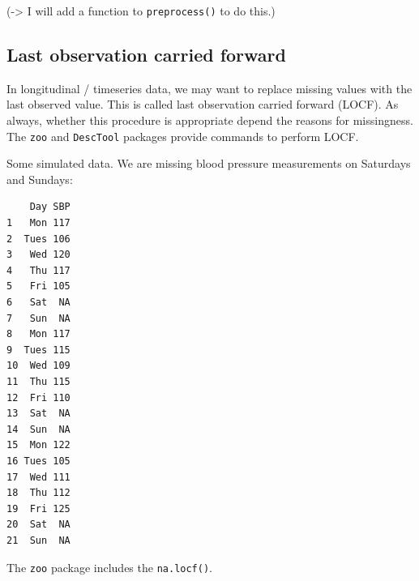 \documentclass[
]{book}
\newenvironment{Shaded}{\begin{snugshade}}{\end{snugshade}}
\newcommand{\AttributeTok}[1]{\textcolor[rgb]{0.77,0.63,0.00}{#1}}
\newcommand{\ConstantTok}[1]{\textcolor[rgb]{0.00,0.00,0.00}{#1}}
\newcommand{\DecValTok}[1]{\textcolor[rgb]{0.00,0.00,0.81}{#1}}
\newcommand{\FunctionTok}[1]{\textcolor[rgb]{0.00,0.00,0.00}{#1}}
\newcommand{\NormalTok}[1]{#1}
\newcommand{\OtherTok}[1]{\textcolor[rgb]{0.56,0.35,0.01}{#1}}
\newcommand{\SpecialCharTok}[1]{\textcolor[rgb]{0.00,0.00,0.00}{#1}}
\newcommand{\StringTok}[1]{\textcolor[rgb]{0.31,0.60,0.02}{#1}}
\begin{document}
(-\textgreater{} I will add a function to \texttt{preprocess()} to do this.)

\hypertarget{last-observation-carried-forward}{%
\subsection{Last observation carried forward}\label{last-observation-carried-forward}}

In longitudinal / timeseries data, we may want to replace missing values with the last observed value. This is called last observation carried forward (LOCF). As always, whether this procedure is appropriate depend the reasons for missingness. The \texttt{zoo} and \texttt{DescTool} packages provide commands to perform LOCF.

Some simulated data. We are missing blood pressure measurements on Saturdays and Sundays:

\begin{Shaded}
\end{Shaded}

\begin{verbatim}
    Day SBP
1   Mon 117
2  Tues 106
3   Wed 120
4   Thu 117
5   Fri 105
6   Sat  NA
7   Sun  NA
8   Mon 117
9  Tues 115
10  Wed 109
11  Thu 115
12  Fri 110
13  Sat  NA
14  Sun  NA
15  Mon 122
16 Tues 105
17  Wed 111
18  Thu 112
19  Fri 125
20  Sat  NA
21  Sun  NA
\end{verbatim}

The \texttt{zoo} package includes the \texttt{na.locf()}.
\end{document}
